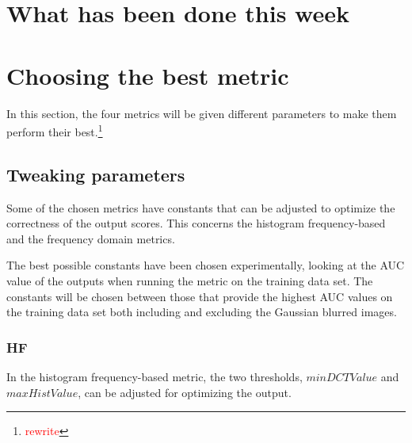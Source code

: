 \section*{What has been done this week}


\section{Choosing the best metric}
In this section, the four metrics will be given different parameters to make them perform their best.\footnote{\textcolor{red}{rewrite}}

\subsection{Tweaking parameters}
Some of the chosen metrics have constants that can be adjusted to optimize the correctness of the output scores. This concerns the histogram frequency-based and the frequency domain metrics.

The best possible constants have been chosen experimentally, looking at the AUC value of the outputs when running the metric on the training data set. The constants will be chosen between those that provide the highest AUC values on the training data set both including and excluding the Gaussian blurred images.

\subsubsection{HF}
In the histogram frequency-based metric, the two thresholds, $minDCTValue$ and $maxHistValue$, can be adjusted for optimizing the output.

